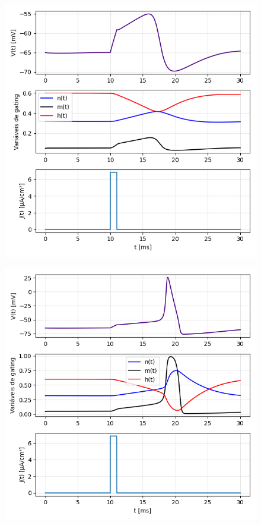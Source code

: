 \documentclass[english,11pt,a4paper]{article}
\begin{document}
	\begin{figure}[H]
		\centering
		\begin{minipage}{0.49\textwidth}
			\centering
			\includegraphics[width=\linewidth]{../figures/ex_3_1.png}
			\captionsetup{justification=centering, labelformat=empty}
			\label{}
		\end{minipage}
		\hfill
		\begin{minipage}{0.49\textwidth}
			\centering
			\includegraphics[width=\linewidth]{../figures/ex_3_2.png}

\end{minipage}
\end{figure}
\end{document}

